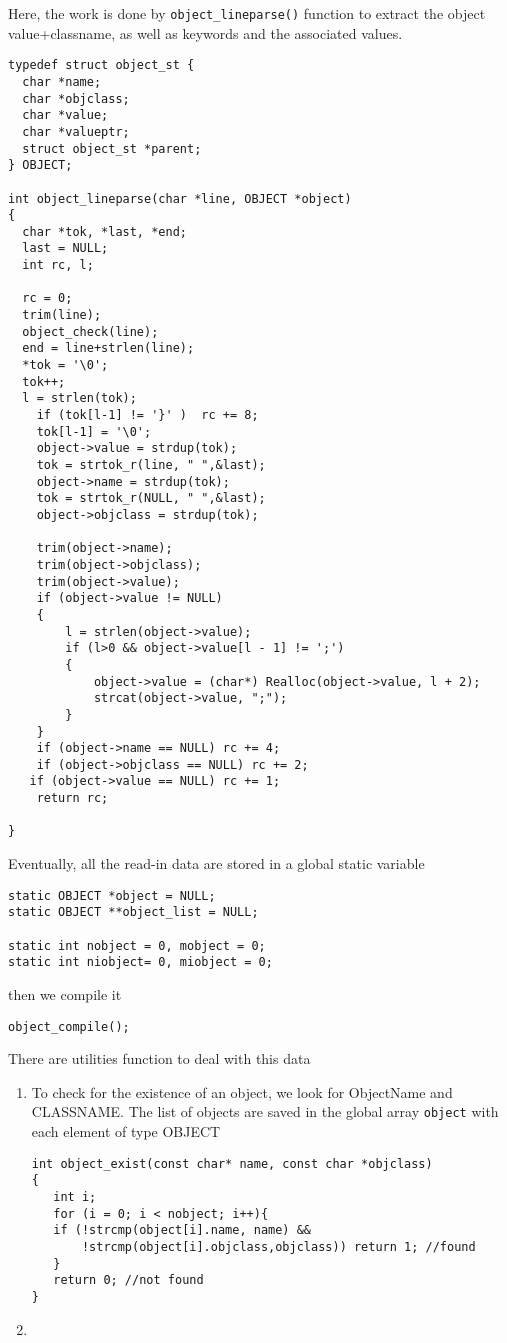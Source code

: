 Here, the work is done by \verb!object_lineparse()! function to
extract the object value+classname, as well as keywords and the associated
values.
\begin{verbatim}
typedef struct object_st {
  char *name;
  char *objclass;
  char *value;
  char *valueptr;
  struct object_st *parent;
} OBJECT;

int object_lineparse(char *line, OBJECT *object)
{
  char *tok, *last, *end;
  last = NULL;
  int rc, l;
  
  rc = 0;
  trim(line);
  object_check(line);
  end = line+strlen(line);
  *tok = '\0';
  tok++; 
  l = strlen(tok);
    if (tok[l-1] != '}' )  rc += 8;
    tok[l-1] = '\0'; 
    object->value = strdup(tok); 
    tok = strtok_r(line, " ",&last);
    object->name = strdup(tok);
    tok = strtok_r(NULL, " ",&last);
    object->objclass = strdup(tok);

    trim(object->name);
    trim(object->objclass);
    trim(object->value);
    if (object->value != NULL)
    {
        l = strlen(object->value);
        if (l>0 && object->value[l - 1] != ';')
        {         
            object->value = (char*) Realloc(object->value, l + 2);
            strcat(object->value, ";");
        }
    }
    if (object->name == NULL) rc += 4; 
    if (object->objclass == NULL) rc += 2;
   if (object->value == NULL) rc += 1;
    return rc;
  
}
\end{verbatim}

Eventually, all the read-in data are stored in a global static variable
\begin{verbatim}
static OBJECT *object = NULL;
static OBJECT **object_list = NULL;

static int nobject = 0, mobject = 0;
static int niobject= 0, miobject = 0;
\end{verbatim}


then we compile it 
\begin{verbatim}
object_compile();
\end{verbatim}

  
There are utilities function to deal with this data
\begin{enumerate}
  \item To check for the existence of an object, we look for ObjectName and
  CLASSNAME. The list of objects are saved in the global array
  \verb!object! with each element of type OBJECT
  
\begin{verbatim}
int object_exist(const char* name, const char *objclass)
{
   int i;
   for (i = 0; i < nobject; i++){
   if (!strcmp(object[i].name, name) &&
       !strcmp(object[i].objclass,objclass)) return 1; //found
   }
   return 0; //not found
}
\end{verbatim}
    
    \item 
  \end{enumerate}
  
